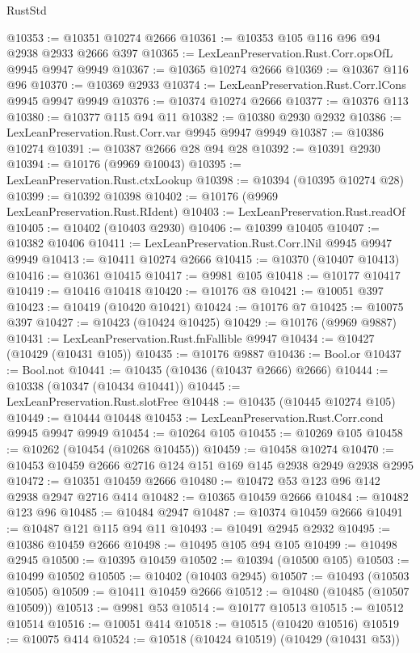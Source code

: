 \begin{lexlean}{RustStd}
\begin{coremodule}
@10353 := @10351 @10274 @2666
@10361 := @10353 @105 @116 @96 @94 @2938 @2933 @2666 @397
@10365 := LexLeanPreservation.Rust.Corr.opsOfL @9945 @9947 @9949
@10367 := @10365 @10274 @2666
@10369 := @10367 @116 @96
@10370 := @10369 @2933
@10374 := LexLeanPreservation.Rust.Corr.lCons @9945 @9947 @9949
@10376 := @10374 @10274 @2666
@10377 := @10376 @113
@10380 := @10377 @115 @94 @11
@10382 := @10380 @2930 @2932
@10386 := LexLeanPreservation.Rust.Corr.var @9945 @9947 @9949
@10387 := @10386 @10274
@10391 := @10387 @2666 @28 @94 @28
@10392 := @10391 @2930
@10394 := @10176 (@9969 @10043)
@10395 := LexLeanPreservation.Rust.ctxLookup
@10398 := @10394 (@10395 @10274 @28)
@10399 := @10392 @10398
@10402 := @10176 (@9969 LexLeanPreservation.Rust.RIdent)
@10403 := LexLeanPreservation.Rust.readOf
@10405 := @10402 (@10403 @2930)
@10406 := @10399 @10405
@10407 := @10382 @10406
@10411 := LexLeanPreservation.Rust.Corr.lNil @9945 @9947 @9949
@10413 := @10411 @10274 @2666
@10415 := @10370 (@10407 @10413)
@10416 := @10361 @10415
@10417 := @9981 @105
@10418 := @10177 @10417
@10419 := @10416 @10418
@10420 := @10176 @8
@10421 := @10051 @397
@10423 := @10419 (@10420 @10421)
@10424 := @10176 @7
@10425 := @10075 @397
@10427 := @10423 (@10424 @10425)
@10429 := @10176 (@9969 @9887)
@10431 := LexLeanPreservation.Rust.fnFallible @9947
@10434 := @10427 (@10429 (@10431 @105))
@10435 := @10176 @9887
@10436 := Bool.or
@10437 := Bool.not
@10441 := @10435 (@10436 (@10437 @2666) @2666)
@10444 := @10338 (@10347 (@10434 @10441))
@10445 := LexLeanPreservation.Rust.slotFree
@10448 := @10435 (@10445 @10274 @105)
@10449 := @10444 @10448
@10453 := LexLeanPreservation.Rust.Corr.cond @9945 @9947 @9949
@10454 := @10264 @105
@10455 := @10269 @105
@10458 := @10262 (@10454 (@10268 @10455))
@10459 := @10458 @10274
@10470 := @10453 @10459 @2666 @2716 @124 @151 @169 @145 @2938 @2949 @2938 @2995
@10472 := @10351 @10459 @2666
@10480 := @10472 @53 @123 @96 @142 @2938 @2947 @2716 @414
@10482 := @10365 @10459 @2666
@10484 := @10482 @123 @96
@10485 := @10484 @2947
@10487 := @10374 @10459 @2666
@10491 := @10487 @121 @115 @94 @11
@10493 := @10491 @2945 @2932
@10495 := @10386 @10459 @2666
@10498 := @10495 @105 @94 @105
@10499 := @10498 @2945
@10500 := @10395 @10459
@10502 := @10394 (@10500 @105)
@10503 := @10499 @10502
@10505 := @10402 (@10403 @2945)
@10507 := @10493 (@10503 @10505)
@10509 := @10411 @10459 @2666
@10512 := @10480 (@10485 (@10507 @10509))
@10513 := @9981 @53
@10514 := @10177 @10513
@10515 := @10512 @10514
@10516 := @10051 @414
@10518 := @10515 (@10420 @10516)
@10519 := @10075 @414
@10524 := @10518 (@10424 @10519) (@10429 (@10431 @53))

\end{coremodule}
\end{lexlean}
